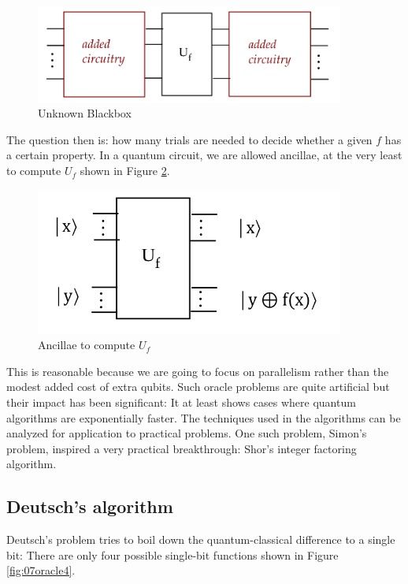 \documentclass[main.tex]{subfiles}
\begin{document}
    \begin{figure}
        \centering
        \includegraphics[width=4in]{notes/figs/n11/05oracle3c.png}
        \caption{Unknown Blackbox}
        \label{fig:05oracle3c}
    \end{figure}
    
    The question then is: how many trials are needed to decide whether a given $f$ has a certain property. In a quantum circuit, we are allowed ancillae, at the very least to compute $U_{f}$ shown in Figure \ref{fig:06oracle3d}.
    
    \begin{figure}
        \centering
        \includegraphics[width=4in]{notes/figs/n11/06oracle3d.png}
        \caption{Ancillae to compute $U_{f}$}
        \label{fig:06oracle3d}
    \end{figure}
    
    This is reasonable because we are going to focus on parallelism rather than the modest added cost of extra qubits. Such oracle problems are quite artificial but their impact has been significant: It at least shows cases where quantum algorithms are exponentially faster. The techniques used in the algorithms can be analyzed for application to practical problems. One such problem, Simon's problem, inspired a very practical breakthrough: Shor's integer factoring algorithm.

\subsection{Deutsch's algorithm}

    Deutsch's problem tries to boil down the quantum-classical difference to a single bit: There are only four possible single-bit functions shown in Figure \ref{fig:07oracle4}.
    
\end{document}
